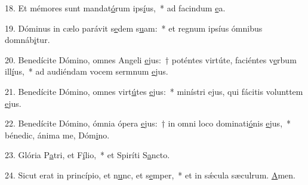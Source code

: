 18. Et mémores sunt mandat\uline{ó}rum ips\uline{í}us,~* ad facindum \uline{e}a.\par 
19. Dóminus in cælo parávit s\uline{e}dem s\uline{u}am:~* et regnum ipsíus ómnibus domnáb\uline{i}tur.\par 
20. Benedícite Dómino, omnes Angeli \uline{e}jus:~† poténtes virtúte, faciéntes v\uline{e}rbum ill\uline{í}us,~* ad audiéndam vocem sermnum \uline{e}jus.\par 
21. Benedícite Dómino, omnes virt\uline{ú}tes \uline{e}jus:~* minístri ejus, qui fácitis volunttem \uline{e}jus.\par 
22. Benedícite Dómino, ómnia ópera \uline{e}jus:~† in omni loco dominati\uline{ó}nis \uline{e}jus,~* bénedic, ánima me, Dóm\uline{i}no.\par 
23. Glória P\uline{a}tri, et F\uline{í}lio,~* et Spiríti S\uline{a}ncto.\par 
24. Sicut erat in princípio, et n\uline{u}nc, et s\uline{e}mper,~* et in sǽcula sæculrum. \uline{A}men.\par 
